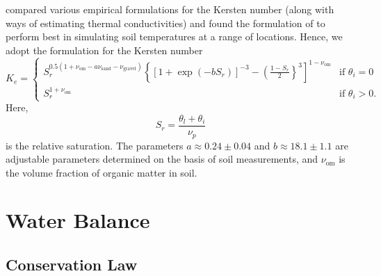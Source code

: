 \documentclass{report}
\begin{document}
\citet{Dai19a} compared various empirical formulations for the Kersten number (along with ways of estimating thermal conductivities) and found the formulation of \citet{Balland05a} to perform best in simulating soil temperatures at a range of locations. Hence, we adopt the \citet{Balland05a} formulation for the Kersten number
\begin{equation}\label{e:Kersten}
    K_e = 
    \begin{cases}
    S_r^{0.5(1 + \nu_{\mathrm{om}} -a \nu_{\mathrm{sand}} - \nu_{\mathrm{gravel}})}
    \left\{ \left[ 1+\exp(-b S_r)\right]^{-3}  - \left(\frac{1-S_r}{2} \right\}^3 \right]^{1-\nu_{\mathrm{om}}} &
     \text{if }\theta_i = 0\\
     S_r^{1+\nu_{\mathrm{om}}} &  \text{if }\theta_i > 0.
    \end{cases}
\end{equation}
Here,
\begin{equation}
    S_r = \frac{\theta_l + \theta_i}{\nu_p}
\end{equation}
is the relative saturation. The parameters $a\approx 0.24 \pm 0.04$ and $b\approx 18.1 \pm 1.1$ are adjustable parameters determined on the basis of soil measurements, and $\nu_{\mathrm{om}}$ is the volume fraction of organic matter in soil. 

\section{Water Balance}\label{s:water_balance}

\subsection{Conservation Law}
\end{document}

